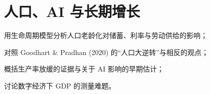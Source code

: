 \chapter{人口、AI 与长期增长}\label{ch:demography}

\begin{chapterguide}
\begin{guidegoals}
\item 用生命周期模型分析人口老龄化对储蓄、利率与劳动供给的影响；
\item 对照 Goodhart \& Pradhan (2020) 的“人口大逆转”与相反的观点；
\item 概括生产率放缓的证据与关于 AI 影响的早期估计；
\item 讨论数字经济下 GDP 的测量难题。
\end{guidegoals}
\end{chapterguide}

\chapterstub
